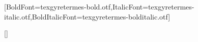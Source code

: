 \usepackage[margin=18mm,bottom=19mm]{geometry}
\usepackage{fontspec}
\usepackage[UTF8,fontset=fandol]{ctex}
\setmainfont{texgyretermes-regular.otf}[BoldFont=texgyretermes-bold.otf,ItalicFont=texgyretermes-italic.otf,BoldItalicFont=texgyretermes-bolditalic.otf]
\usepackage{titlesec}
\usepackage{enumitem}
\usepackage{hyperref}
\usepackage{xurl}
\setlength{\parindent}{0pt}
\setlength{\parskip}{3pt}
\pagestyle{plain}
\titleformat{\section}{\large\bfseries}{}{0pt}{}[\vspace{2pt}\titlerule]
\titlespacing*{\section}{0pt}{10pt}{5pt}
\newcommand{\entry}[3]{\par\addvspace{7pt}\textbf{#1}\par\textit{#2}\hfill #3\par}
\linespread{1}
\raggedbottom
